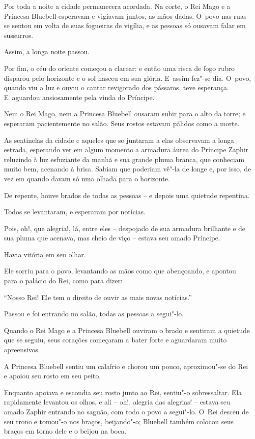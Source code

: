 Por toda a noite a cidade permanecera acordada. Na corte, o Rei Mago e a
Princesa Bluebell esperavam e vigiavam juntos, as mãos dadas. O~povo nas
ruas se sentou em volta de suas fogueiras de vigília, e as pessoas só
ousavam falar em sussurros.

Assim, a longa noite passou.

Por fim, o céu do oriente começou a clarear; e então uma risca de fogo
rubro disparou pelo horizonte e o sol nasceu em sua glória. E~assim
fez"-se dia. O~povo, quando viu a luz e ouviu o cantar revigorado dos
pássaros, teve esperança. E~aguardou ansiosamente pela vinda do
Príncipe.

Nem o Rei Mago, nem a Princesa Bluebell ousaram subir para o alto da
torre; e esperaram pacientemente no salão. Seus rostos estavam pálidos
como a morte.

As sentinelas da cidade e aqueles que se juntaram a elas observavam a
longa estrada, esperando ver em algum momento a armadura áurea do
Príncipe Zaphir reluzindo à luz esfuziante da manhã e sua grande pluma
branca, que conheciam muito bem, acenando à brisa. Sabiam que poderiam
vê"-la de longe e, por isso, de vez em quando davam só uma olhada para o
horizonte.

De repente, houve brados de todas as pessoas -- e depois uma quietude
repentina.

Todos se levantaram, e esperaram por notícias.

Pois, oh!, que alegria!, lá, entre eles -- despojado de sua armadura
brilhante e de sua pluma que acenava, mas cheio de viço -- estava seu
amado Príncipe.

Havia vitória em seu olhar.

Ele sorriu para o povo, levantando as mãos como que abençoando, e apontou
para o palácio do Rei, como para dizer:

``Nosso Rei! Ele tem o direito de ouvir as mais novas notícias.''

Passou e foi entrando no salão, todas as pessoas a segui"-lo.

\smallskip
Quando o Rei Mago e a Princesa Bluebell ouviram o brado e sentiram a
quietude que se seguiu, seus corações começaram a bater forte e
aguardaram muito apreensivos.

A Princesa Bluebell sentiu um calafrio e chorou um pouco, aproximou"-se
do Rei e apoiou seu rosto em seu peito.

Enquanto apoiava e escondia seu rosto junto ao Rei, sentiu"-o
sobressaltar. Ela rapidamente levantou os olhos, e ali -- oh!, alegria
das alegrias! -- estava seu amado Zaphir entrando no saguão, com todo o
povo a segui"-lo. O~Rei desceu de seu trono e tomou"-o nos braços,
beijando"-o; Bluebell também colocou seus braços em torno dele e o beijou
na boca.

